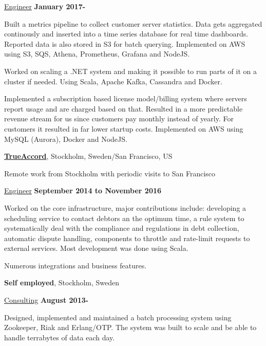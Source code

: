 \documentclass[10pt]{article}
\renewcommand\textit[1]{\underline{#1}}
\newcommand{\halfblankline}{\quad\vspace{-0.5\baselineskip}\pagebreak[3]}
\begin{document}
\begin{outerlist}
\item[] \textit{Engineer}
  \hfill \textbf{January 2017-}
  \begin{innerlist}
  \item
    Built a metrics pipeline to collect customer server statistics.
    Data gets aggregated continously and inserted into a time series database
    for real time dashboards. Reported data is also stored in S3 for batch
    querying.
    Implemented on AWS using S3, SQS, Athena, Prometheus, Grafana and NodeJS.
  \item
    Worked on scaling a .NET system and making it possible to run parts of it on
    a cluster if needed. Using Scala, Apache Kafka, Cassandra and Docker.
  \item
    Implemented a subscription based license model/billing system where servers
    report usage and are charged based on that. Resulted in a more predictable
    revenue stream for us since customers pay monthly instead of yearly. For
    customers it resulted in far lower startup costs.
    Implemented on AWS using MySQL (Aurora), Docker and NodeJS.
  \end{innerlist}
\end{outerlist}

\halfblankline

\href{http://www.trueaccord.com/}{\textbf{TrueAccord}},
Stockholm, Sweden/San Francisco, US

Remote work from Stockholm with periodic visits to San Francisco
\begin{outerlist}
\item[] \textit{Engineer}
  \hfill \textbf{September 2014 to November 2016}
  \begin{innerlist}
  \item
      Worked on the core infrastructure, major contributions include:
      developing a scheduling service to contact debtors an the optimum time,
      a rule system to systematically deal with the compliance and regulations
      in debt collection, automatic dispute handling, components to throttle
      and rate-limit requests to external services. Most development was done
      using Scala.
    \item
      Numerous integrations and business features.
  \end{innerlist}
\end{outerlist}

\halfblankline

\textbf{Self employed},
Stockholm, Sweden
\begin{outerlist}
\item[] \textit{Consulting}
  \hfill \textbf{August 2013-}
  \begin{innerlist}
    \item
      Designed, implemented and maintained a batch processing system using
      Zookeeper, Riak and Erlang/OTP. The system was built to scale and be
      able to handle terrabytes of data each day.
  \end{innerlist}
\end{outerlist}
\end{document}
